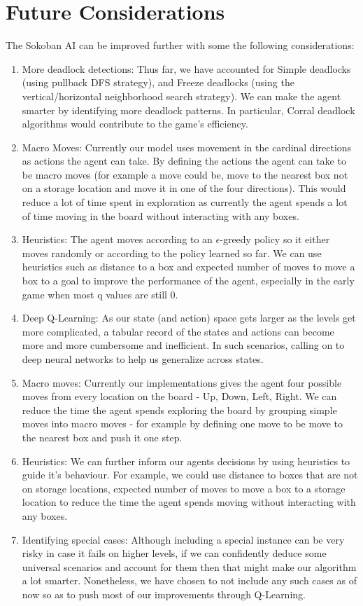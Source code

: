 \documentclass{article}
\begin{document}
\section{Future Considerations}
The Sokoban AI can be improved further with some the following considerations:
\begin{enumerate}
    \item More deadlock detections: Thus far, we have accounted for Simple deadlocks (using pullback DFS strategy), and Freeze deadlocks (using the vertical/horizontal neighborhood search strategy). We can make the agent smarter by identifying more deadlock patterns. In particular, Corral deadlock algorithms would contribute to the game's efficiency.
    \item Macro Moves: Currently our model uses movement in the cardinal directions as actions the agent can take. By defining the actions the agent can take to be macro moves (for example a move could be, move to the nearest box not on a storage location and move it in one of the four directions). This would reduce a lot of time spent in exploration as currently the agent spends a lot of time moving in the board without interacting with any boxes.
    \item Heuristics: The agent moves according to an $\epsilon$-greedy policy so it either moves randomly or according to the policy learned so far. We can use heuristics such as distance to a box and expected number of moves to move a box to a goal to improve the performance of the agent, especially in the early game when most q values are still $0$. 
    \item Deep Q-Learning: As our state (and action) space gets larger as the levels get more complicated, a tabular record of the states and actions can become more and more cumbersome and inefficient. In such scenarios, calling on to deep neural networks to help us generalize across states.
    \item Macro moves: Currently our implementations gives the agent four possible moves from every location on the board - Up, Down, Left, Right. We can reduce the time the agent spends exploring the board by grouping simple moves into macro moves - for example by defining one move to be move to the nearest box and push it one step. 
    \item Heuristics: We can further inform our agents decisions by using heuristics to guide it's behaviour. For example, we could use distance to boxes that are not on storage locations, expected number of moves to move a box to a storage location to reduce the time the agent spends moving without interacting with any boxes. 
    \item Identifying special cases: Although including a special instance can be very risky in case it fails on higher levels, if we can confidently deduce some universal scenarios and account for them then that might make our algorithm a lot smarter. Nonetheless, we have chosen to not include any such cases as of now so as to push most of our improvements through Q-Learning. 
\end{enumerate}
\end{document}
